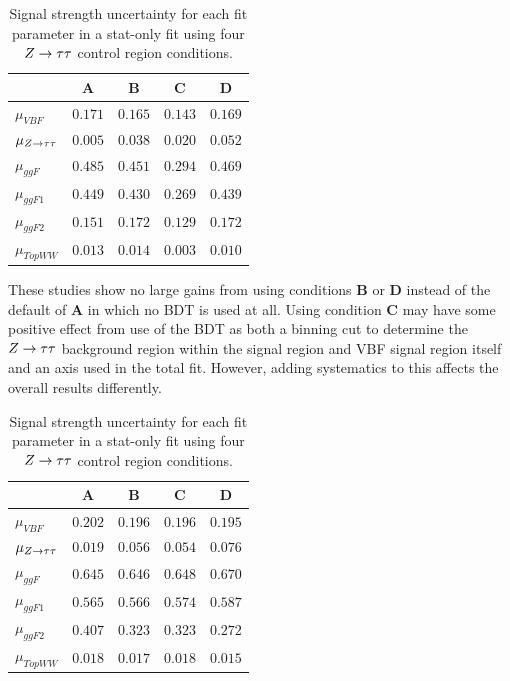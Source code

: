 \begin{table}[h!]
\centering
\begin{tabular}{|l|c|c|c|c|}
\hline
     & \textbf{A}   & \textbf{B} & \textbf{C} & \textbf{D}     \\
\hline
$\mu_{VBF}$ & $ 0.171$ &  $0.165$ & $0.143$ & $0.169$\\
$\mu_{Z\rightarrow\tau\tau}$ & $ 0.005$ & $0.038$ & $0.020$ & $0.052$\\
$\mu_{ggF}$ & $0.485$ & $0.451$ & $ 0.294$ & $0.469$\\
$\mu_{ggF1}$ & $0.449$ & $0.430$ & $0.269$ & $ 0.439$\\
$\mu_{ggF2}$ & $0.151$ & $0.172$ & $0.129$ & $0.172$\\
$\mu_{TopWW}$ & $0.013$ & $0.014$ & $0.003$ & $0.010$ \\
\hline
\end{tabular}
\caption{Signal strength uncertainty for each fit parameter in a stat-only fit using four $Z\rightarrow\tau\tau$ control region conditions.}
\label{tab:ZBDTstatonly}
\end{table}
 
These studies show no large gains from using conditions \textbf{B} or \textbf{D} instead of the default of \textbf{A} in which no BDT is used at all. Using condition \textbf{C} may have some positive effect from use of the BDT as both a binning cut to determine the $Z\rightarrow\tau\tau$ background region within the signal region and VBF signal region itself and an axis used in the total fit. However, adding systematics to this affects the overall results differently.  

\begin{table}[h!]
\centering
\begin{tabular}{|l|c|c|c|c|}
\hline
     & \textbf{A}   & \textbf{B} & \textbf{C} & \textbf{D}     \\
\hline
$\mu_{VBF}$ & $0.202$ &  $0.196$ & $0.196$ & $0.195$\\
$\mu_{Z\rightarrow\tau\tau}$ & $0.019$ & $0.056$ & $0.054$ & $0.076$\\
$\mu_{ggF}$ & $0.645$ & $0.646$ & $0.648$ & $0.670$\\
$\mu_{ggF1}$ & $0.565$ & $0.566$ & $0.574$ & $0.587$\\
$\mu_{ggF2}$ & $0.407$ & $0.323$ & $0.323$ & $0.272$\\
$\mu_{TopWW}$ & $0.018$ & $0.017$ & $0.018$ & $0.015$ \\
\hline
\end{tabular}
\caption{Signal strength uncertainty for each fit parameter in a stat-only fit using four $Z\rightarrow\tau\tau$ control region conditions.}
\label{tab:ZBDTstatsys}
\end{table}

